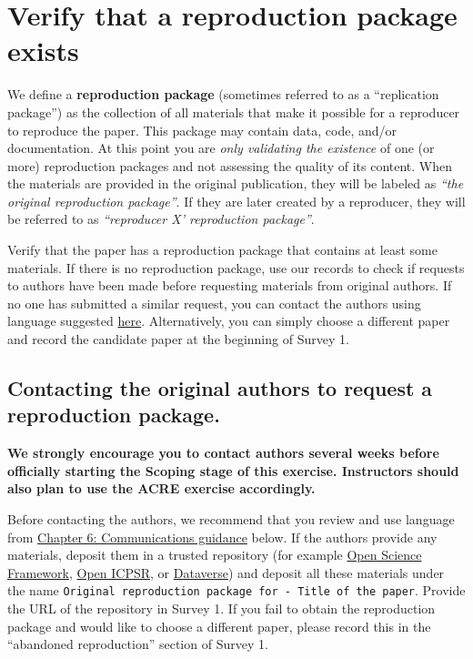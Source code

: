 \documentclass[]{book}
\begin{document}
\hypertarget{verify-rep-mat}{%
\section{Verify that a reproduction package exists}\label{verify-rep-mat}}

We define a \textbf{reproduction package} (sometimes referred to as a ``replication package'') as the collection of all materials that make it possible for a reproducer to reproduce the paper. This package may contain data, code, and/or documentation. At this point you are \emph{only validating the existence} of one (or more) reproduction packages and not assessing the quality of its content. When the materials are provided in the original publication, they will be labeled as \emph{``the original reproduction package''}. If they are later created by a reproducer, they will be referred to as \emph{``reproducer X' reproduction package''}.

Verify that the paper has a reproduction package that contains at least some materials. If there is no reproduction package, use our records to check if requests to authors have been made before requesting materials from original authors. If no one has submitted a similar request, you can contact the authors using language suggested \protect\hyperlink{for-reproducers-contacting-the-authors-of-the-original-study}{here}. Alternatively, you can simply choose a different paper and record the candidate paper at the beginning of Survey 1.

\hypertarget{contacting-the-original-authors-to-request-a-reproduction-package.}{%
\subsection*{Contacting the original authors to request a reproduction package.}\label{contacting-the-original-authors-to-request-a-reproduction-package.}}

\textbf{We strongly encourage you to contact authors several weeks before officially starting the Scoping stage of this exercise. Instructors should also plan to use the ACRE exercise accordingly.}

Before contacting the authors, we recommend that you review and use language from \href{https://bitss.github.io/ACRE/guidance-for-a-constructive-exchange-between-reproducers-and-original-authors.html}{Chapter 6: Communications guidance} below. If the authors provide any materials, deposit them in a trusted repository (for example \href{https://osf.io/}{Open Science Framework}, \href{https://www.openicpsr.org/openicpsr/}{Open ICPSR}, or \href{https://dataverse.org/}{Dataverse}) and deposit all these materials under the name \texttt{Original\ reproduction\ package\ for\ -\ Title\ of\ the\ paper}. Provide the URL of the repository in Survey 1. If you fail to obtain the reproduction package and would like to choose a different paper, please record this in the ``abandoned reproduction'' section of Survey 1.
\end{document}
